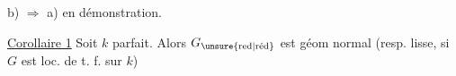b) $\Rightarrow$ a) \qquad {} en démonstration.

\uline{Corollaire 1} Soit $k$ parfait. Alors $G_{\text{\unsure{red|réd}}}$ est géom normal  (resp. lisse, si $G$ est loc. de t. f. sur $k$)



